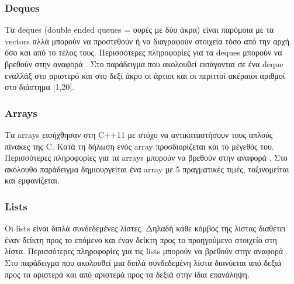 




\subsubsection{Deques}
Τα deques (double ended queues = ουρές με δύο άκρα) είναι παρόμοια με τα vectors αλλά μπορούν να προστεθούν ή να διαγραφούν στοιχεία τόσο από την αρχή όσο και από το τέλος τους. Περισσότερες πληροφορίες για τα deques μπορούν να βρεθούν στην αναφορά \cite{g4gdeque}. Στο παράδειγμα που ακολουθεί εισάγονται σε ένα deque εναλλάξ στο αριστερό και στο δεξί άκρο οι άρτιοι και οι περιττοί ακέραιοι αριθμοί στο διάστημα [1,20].






\subsubsection{Arrays}
Τα arrays εισήχθησαν στη C++11 με στόχο να αντικαταστήσουν τους απλούς πίνακες της C. Κατά τη δήλωση ενός array προσδιορίζεται και το μέγεθός του. Περισσότερες πληροφορίες για τα arrays μπορούν να βρεθούν στην αναφορά \cite{g4garray}. Στο ακόλουθο παράδειγμα δημιουργείται ένα array με 5 πραγματικές τιμές, ταξινομείται και εμφανίζεται.






\subsubsection{Lists}
Οι lists είναι διπλά συνδεδεμένες λίστες. Δηλαδή κάθε κόμβος της λίστας διαθέτει έναν δείκτη προς το επόμενο και έναν δείκτη προς το προηγούμενο στοιχείο στη λίστα. Περισσότερες πληροφορίες για τις lists μπορούν να βρεθούν στην αναφορά \cite{g4glist}. Στο παράδειγμα που ακολουθεί μια διπλά συνδεδεμένη λίστα διανύεται από δεξιά προς τα αριστερά και από αριστερά προς τα δεξιά στην ίδια επανάληψη.



